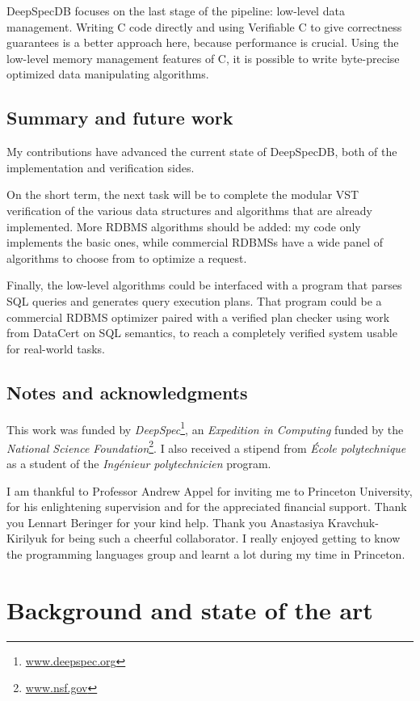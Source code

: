 \documentclass[11pt]{article}
\begin{document}
DeepSpecDB focuses on the last stage of the pipeline: low-level data management.
Writing C code directly and using Verifiable C to give correctness guarantees is a better approach here,
because performance is crucial.
Using the low-level memory management features of C, it is possible to write byte-precise optimized data manipulating algorithms.

\subsection*{Summary and future work}

My contributions have advanced the current state of DeepSpecDB, both of the implementation and verification sides.

On the short term, the next task will be to complete the modular VST verification of the various data structures and algorithms that are already implemented.
More RDBMS algorithms should be added: my code only implements the basic ones, while commercial RDBMSs have a wide panel of algorithms to choose from to optimize a request.

Finally, the low-level algorithms could be interfaced with a program that parses SQL queries and generates query execution plans.
That program could be a commercial RDBMS optimizer paired with a verified plan checker using work from DataCert on SQL semantics, to reach a completely verified system usable for real-world tasks.

\subsection*{Notes and acknowledgments}

This work was funded by \emph{DeepSpec}\footnote{\url{www.deepspec.org}}, an \emph{Expedition in Computing} funded by the \emph{National Science Foundation}\footnote{\url{www.nsf.gov}}.
I also received a stipend from \emph{École polytechnique} as a student of the \emph{Ingénieur polytechnicien} program.

I am thankful to Professor Andrew Appel for inviting me to Princeton University, for his enlightening supervision and for the appreciated financial support.
Thank you Lennart Beringer for your kind help. Thank you Anastasiya Kravchuk-Kirilyuk for being such a cheerful collaborator.
I really enjoyed getting to know the programming languages group and learnt a lot during my time in Princeton.

\newpage

\section{Background and state of the art}
\end{document}
